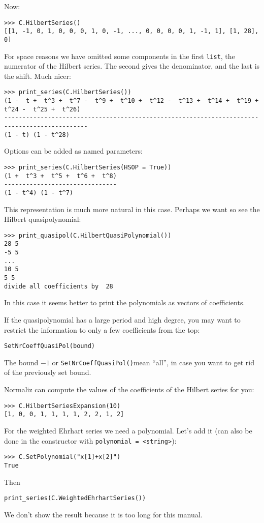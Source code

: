 \begin{small}
Now:
\begin{Verbatim}
>>> C.HilbertSeries()
[[1, -1, 0, 1, 0, 0, 0, 1, 0, -1, ..., 0, 0, 0, 0, 1, -1, 1], [1, 28], 0]
\end{Verbatim}
For space reasons we have omitted some components in the first \verb|list|, the numerator of the Hilbert series. The second gives the denominator, and the last is the shift. Much nicer:
\begin{Verbatim}
>>> print_series(C.HilbertSeries())
(1 -  t +  t^3 +  t^7 -  t^9 +  t^10 +  t^12 -  t^13 +  t^14 +  t^19 +  t^24 -  t^25 +  t^26)
---------------------------------------------------------------------------------------------
(1 - t) (1 - t^28) 
\end{Verbatim}

Options can be added as named parameters:
\begin{Verbatim}
>>> print_series(C.HilbertSeries(HSOP = True))
(1 +  t^3 +  t^5 +  t^6 +  t^8)
-------------------------------
(1 - t^4) (1 - t^7)   
\end{Verbatim}
This representation is much more natural in this case. Perhaps we want so see the Hilbert quasipolynomial:
\begin{Verbatim}
>>> print_quasipol(C.HilbertQuasiPolynomial())
28 5
-5 5
...
10 5
5 5
divide all coefficients by  28
\end{Verbatim}
In this case it seems better to print the polynomials as vectors of coefficients.

If the quasipolynomial has a large period and high degree, you may want to restrict the information to only a few coefficients from the top:
\begin{Verbatim}
SetNrCoeffQuasiPol(bound)
\end{Verbatim}
The bound $-1$ or \verb|SetNrCoeffQuasiPol()|mean ``all'', in case you want to get rid of the previously set bound.

Normaliz can compute the values of the coefficients of the Hilbert series for you:
\begin{Verbatim}
>>> C.HilbertSeriesExpansion(10)
[1, 0, 0, 1, 1, 1, 1, 2, 2, 1, 2]
\end{Verbatim}

For the weighted Ehrhart series we need a polynomial. Let's add it (can also be done in the constructor with \verb|polynomial = <string>|):
\begin{Verbatim}
>>> C.SetPolynomial("x[1]+x[2]")
True
\end{Verbatim}
Then
\begin{Verbatim}
print_series(C.WeightedEhrhartSeries())
\end{Verbatim}
We don't show the result because it is too long for this manual.


\end{small}
